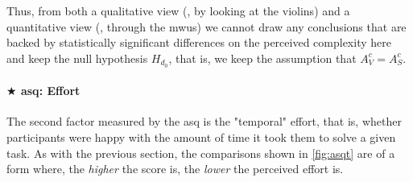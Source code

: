 \documentclass[../thesis]{subfiles}
\begin{document}
Thus, from both a qualitative view (\ie, by looking at the \glspl{violin}) and a quantitative view (\ie, through the \glspl{mwu}) we cannot draw any conclusions that are backed by statistically significant differences on the perceived complexity here and keep the null hypothesis $H_{d_0}$, that is, we keep the assumption that $A^c_V = A^c_S$.

\paragraph{$\bigstar$ \gls{asq}: Effort}
The second factor measured by the \gls{asq} is the "temporal" effort, that is, whether participants were happy with the amount of time it took them to solve a given task.
As with the previous section, the comparisons shown in \cref{fig:asqt} are of a form where, the \emph{higher} the score is, the \emph{lower} the perceived effort is.
\end{document}
